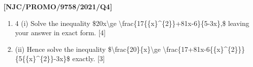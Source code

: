 \item \textbf{{[}NJC/PROMO/9758/2021/Q4{]} }
\begin{enumerate}
\item 4 (i) Solve the inequality \$20x\textbackslash ge \textbackslash frac\{17\{\{x\}\textasciicircum\{2\}\}+81x-6\}\{5-3x\},\$
leaving your answer in exact form. {[}4{]}
\item (ii) Hence solve the inequality \$\textbackslash frac\{20\}\{x\}\textbackslash ge
\textbackslash frac\{17+81x-6\{\{x\}\textasciicircum\{2\}\}\}\{5\{\{x\}\textasciicircum\{2\}\}-3x\}\$
exactly. {[}3{]}
\end{enumerate}